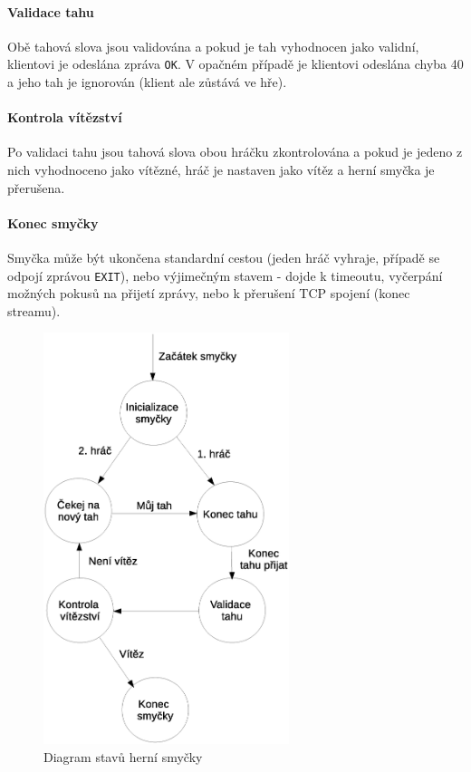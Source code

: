 \documentclass[11pt,a4paper]{scrartcl}
\begin{document}
	\paragraph{Validace tahu}
	Obě tahová slova jsou validována a pokud je tah vyhodnocen jako validní, klientovi je odeslána zpráva \verb|OK|. V opačném případě je klientovi odeslána chyba 40 a jeho tah je ignorován (klient ale zůstává ve hře).
	
	\paragraph{Kontrola vítězství}
	Po validaci tahu jsou tahová slova obou hráčku zkontrolována a pokud je jedeno z nich vyhodnoceno jako vítězné, hráč je nastaven jako vítěz a herní smyčka je přerušena.
	
	\paragraph{Konec smyčky}
	Smyčka může být ukončena standardní cestou (jeden hráč vyhraje, případě se odpojí zprávou \verb|EXIT|), nebo výjimečným stavem - dojde k timeoutu, vyčerpání možných pokusů na přijetí zprávy, nebo k přerušení TCP spojení (konec streamu).
	
	\begin{figure}[H]
		\centering
		\includegraphics[height=12cm]{server_h_smycka.eps}
		\caption{Diagram stavů herní smyčky}
	\end{figure}
	
\end{document}
